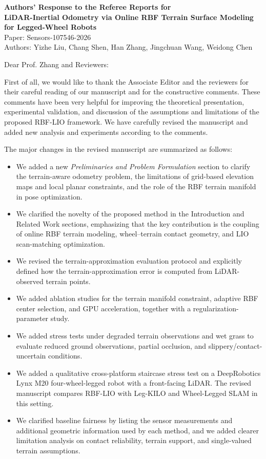\documentclass[11pt]{article}
\begin{document}
\begin{center}
{\Large\bfseries Authors' Response to the Referee Reports for}\\[0.4em]
{\large\bfseries LiDAR-Inertial Odometry via Online RBF Terrain Surface Modeling for Legged-Wheel Robots}\\[0.3em]
{\large Paper: Sensors-107546-2026}\\[0.2em]
{\large Authors: Yizhe Liu, Chang Shen, Han Zhang, Jingchuan Wang, Weidong Chen}
\end{center}

\vspace{1em}

\noindent Dear Prof. Zhang and Reviewers:

First of all, we would like to thank the Associate Editor and the reviewers for their careful reading of our manuscript and for the constructive comments. These comments have been very helpful for improving the theoretical presentation, experimental validation, and discussion of the assumptions and limitations of the proposed RBF-LIO framework. We have carefully revised the manuscript and added new analysis and experiments according to the comments.

The major changes in the revised manuscript are summarized as follows:
\begin{itemize}
    \item We added a new \textit{Preliminaries and Problem Formulation} section to clarify the terrain-aware odometry problem, the limitations of grid-based elevation maps and local planar constraints, and the role of the RBF terrain manifold in pose optimization.
    \item We clarified the novelty of the proposed method in the Introduction and Related Work sections, emphasizing that the key contribution is the coupling of online RBF terrain modeling, wheel--terrain contact geometry, and LIO scan-matching optimization.
    \item We revised the terrain-approximation evaluation protocol and explicitly defined how the terrain-approximation error is computed from LiDAR-observed terrain points.
    \item We added ablation studies for the terrain manifold constraint, adaptive RBF center selection, and GPU acceleration, together with a regularization-parameter study.
    \item We added stress tests under degraded terrain observations and wet grass to evaluate reduced ground observations, partial occlusion, and slippery/contact-uncertain conditions.
    \item We added a qualitative cross-platform staircase stress test on a DeepRobotics Lynx M20 four-wheel-legged robot with a front-facing LiDAR. The revised manuscript compares RBF-LIO with Leg-KILO and Wheel-Legged SLAM in this setting.
    \item We clarified baseline fairness by listing the sensor measurements and additional geometric information used by each method, and we added clearer limitation analysis on contact reliability, terrain support, and single-valued terrain assumptions.
\end{itemize}
\end{document}
